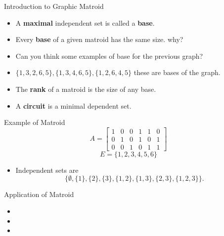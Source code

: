 \documentclass{beamer}
\begin{document}
\begin{frame}{Introduction to Graphic Matroid}
    \begin{itemize}
        \item A \textbf{maximal} independent set is called a \textbf{base}.
        \item Every \textbf{base} of a given matroid has the same size.
        why?
        \item Can you think some examples of base for the previous graph?
        \item $\{1,3,2,6,5\} , \{1,3,4,6,5\} , \{1,2,6,4,5\}$ these are bases of the graph.
        \item The \textbf{rank} of a matroid is the size of any base.
        \item A \textbf{circuit} is a minimal dependent set.
    \end{itemize}
\end{frame}
\begin{frame}{Example of Matroid}
    \[A = \begin{bmatrix}
    1 & 0 & 0 & 1 & 1 & 0 \\
    0 & 1 & 0 & 1 & 0 & 1 \\
    0 & 0 & 1 & 0 & 1 & 1
    \end{bmatrix}\]
    \[E = \{1,2,3,4,5,6 \}\]

    \begin{itemize}
        \item <1-> Independent sets are
        \[
        \{\emptyset, \{1\}, \{2\}, \{3\}, \{1,2\}, \{1, 3\}, \{2, 3\}, \{1, 2, 3\}\}.
        \]
    \end{itemize}
\end{frame}

\begin{frame}{Application of Matroid}

\begin{itemize}
    \item <1->
    \item <2->
    \item <3->
\end{itemize}
    
\end{frame}
\end{document}
